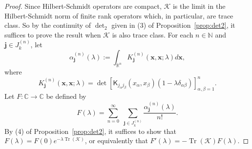 \documentclass{birkjour}
\theoremstyle{definition}
\theoremstyle{remark}
\numberwithin{equation}{section}
\newcommand{\cK}{{\mathcal K}}
\begin{document}
\begin{proof}
    Since Hilbert-Schmidt operators are compact, $\mathcal{K}$ is the limit 
    in the Hilbert-Schmidt norm of finite rank operators which, in particular, are trace class.  
 So by the continuity of $\det_2$ given in (3) of Proposition~\ref{prop:det2}, it suffices to prove the result when $\cK$ is also trace class.
For each $n\in \mathbb N$ and  $ \mathbf{j} \in J^{(n)}_k$,  let 
\begin{equation}\label{defalpha}
    \alpha^{(n)}_{\mathbf{j}}(\lambda) := \int_{\mathbb{R}^n} {K}^{(n)}_{\mathbf{j}}(\mathbf{x},\mathbf{x}; \lambda) d\mathbf{x},
\end{equation}
where
\begin{equation}
    K^{(n)}_{\mathbf{j}}(\mathbf{x}, \mathbf{x}; \lambda) = \det\left[ \textsf{K}_{j_{\alpha} j_{\beta}}(x_{\alpha}, x_{\beta})(1 - \lambda \delta_{\alpha \beta}) \right]_{\alpha, \beta = 1}^n.
\end{equation}
Let $F : \mathbb{C} \rightarrow \mathbb{C} $ be defined by
\begin{equation}\label{eq:Fdef}
    F(\lambda) = \sum_{n=0}^{\infty} \,\,\sum_{\mathbf{j} \in J^{(n)}_k} \frac{\alpha^{(n)}_{\mathbf{j}}(\lambda)}{n!}.
\end{equation}
By (4) of Proposition~\ref{prop:det2}, it suffices to show that
   $ F(\lambda) = F(0) e^{-\lambda \operatorname{Tr}(\mathcal{K})}$,
or equivalently that
    $ F'(\lambda) = -\operatorname{Tr}(\mathcal{K}) F(\lambda)$.
 

\end{proof}
\end{document}
